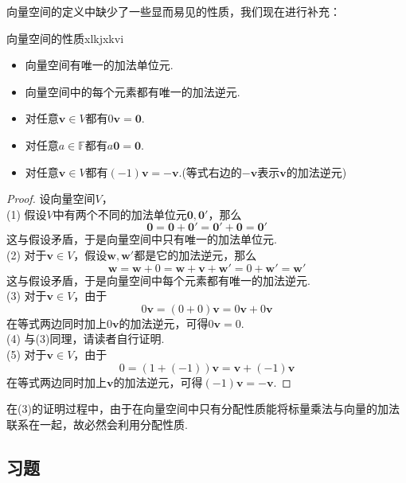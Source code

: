 \documentclass[lang=cn, zihao=5]{elegantbook}
\newcommand{\F}{\mathbb{F}}
\begin{document}
向量空间的定义中缺少了一些显而易见的性质，我们现在进行补充：

\begin{proposition}{向量空间的性质}{xlkjxkvi}
	\begin{itemize}
		\item 向量空间有唯一的加法单位元.
		\item 向量空间中的每个元素都有唯一的加法逆元.
		\item 对任意$\boldsymbol{v} \in V$都有$0\boldsymbol{v}=\boldsymbol{0}$.
		\item 对任意$a \in \F$都有$a\boldsymbol{0}=\boldsymbol{0}$.
		\item 对任意$\boldsymbol{v} \in V$都有$(-1)\boldsymbol{v}=\boldsymbol{-v}$.(等式右边的$\boldsymbol{-v}$表示$\boldsymbol{v}$的加法逆元)
	\end{itemize}
\end{proposition}
\begin{proof}
	设向量空间$V$， \\
	(1) 假设$V$中有两个不同的加法单位元$\boldsymbol{0},\boldsymbol{0'}$，那么$$\boldsymbol{0} = \boldsymbol{0} + \boldsymbol{0'} = \boldsymbol{0'} + \boldsymbol{0} = \boldsymbol{0'}$$
	这与假设矛盾，于是向量空间中只有唯一的加法单位元. \\
	(2) 对于$\boldsymbol{v} \in V$，假设$\boldsymbol{w},\boldsymbol{w'}$都是它的加法逆元，那么$$\boldsymbol{w} = \boldsymbol{w}+0 = \boldsymbol{w} + \boldsymbol{v} + \boldsymbol{w'} = 0 + \boldsymbol{w'} = \boldsymbol{w'}$$
	这与假设矛盾，于是向量空间中每个元素都有唯一的加法逆元. \\
	(3) 对于$\boldsymbol{v} \in V$，由于$$0\boldsymbol{v} = (0+0)\boldsymbol{v} = 0\boldsymbol{v} + 0\boldsymbol{v}$$
	在等式两边同时加上$0\boldsymbol{v}$的加法逆元，可得$0\boldsymbol{v} = 0$. \\
	(4) 与(3)同理，请读者自行证明. \\
	(5) 对于$\boldsymbol{v} \in V$，由于$$0 = (1+(-1))\boldsymbol{v} = \boldsymbol{v} + (-1)\boldsymbol{v}$$
	在等式两边同时加上$\boldsymbol{v}$的加法逆元，可得$(-1)\boldsymbol{v} = \boldsymbol{-v}$.
\end{proof}
\begin{remark}
	在(3)的证明过程中，由于在向量空间中只有分配性质能将标量乘法与向量的加法联系在一起，故必然会利用分配性质.
\end{remark}

\subsection*{习题}
\end{document}
